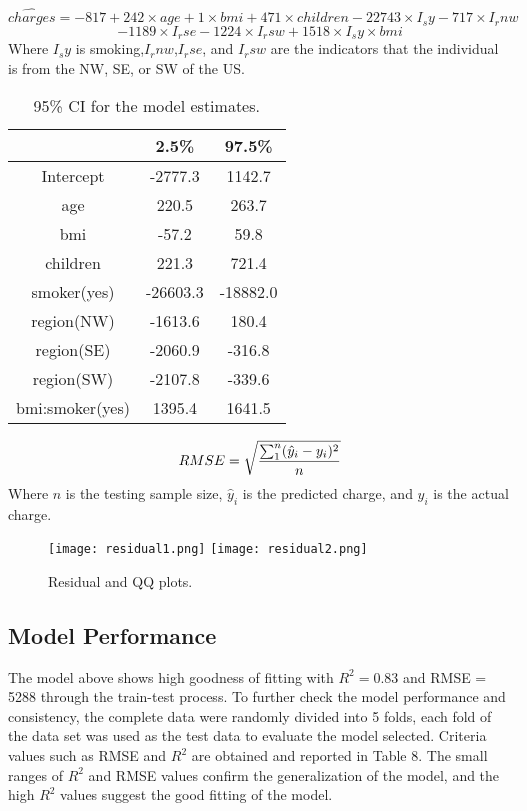 \documentclass[12pt]{article}
\begin{document}
\begin{equation}
\hat{charges} = -817 + 242\times age +1\times bmi +471\times children - 22743\times I_sy - 717\times I_rnw
\end{equation}
$$- 1189\times I_rse- 1224\times I_rsw+ 1518\times I_sy \times bmi$$
Where $I_sy$ is smoking,$I_rnw$,$I_rse$, and $I_rsw$ are the indicators that the individual is from the NW, SE, or SW of the US.

\begin{table}[ht]
\centering
\caption{ 95\% CI for the model estimates.\label{data3}}
\begin{tabular}{|c|c|c|}
\hline
&2.5\% &97.5\% \\\hline 
Intercept& -2777.3& 1142.7\\\hline 
age& 220.5& 263.7\\\hline 
bmi& -57.2& 59.8\\\hline 
children& 221.3& 721.4\\\hline 
smoker(yes)& -26603.3& -18882.0\\\hline 
region(NW)& -1613.6& 180.4\\\hline 
region(SE)& -2060.9& -316.8\\\hline 
region(SW)& -2107.8& -339.6\\\hline 
bmi:smoker(yes)& 1395.4& 1641.5\\\hline 	
\end{tabular}
\end{table}	

\begin{equation}
RMSE=\sqrt{\frac{\sum_{1}^{n}(\hat{y}_i-y_i)^2}{n}}\\
\end{equation}
Where $n$ is the testing sample size, $\hat{y}_i$ is the predicted charge, and $y_i$ is the actual charge.
	
\begin{figure}[!htbp]
\texttt{[image: residual1.png]}
\texttt{[image: residual2.png]}
\caption{Residual and QQ plots.}
\label{fig:method}
\end{figure}	

\subsection{Model Performance}
The model above shows high goodness of fitting with $R^2=0.83$ and RMSE = 5288 through the train-test process. To further check the model performance and consistency, the complete data were randomly divided into 5 folds, each fold of the data set was used as the test data to evaluate the model selected. Criteria values such as RMSE and $R^2$ are obtained and reported in Table 8. The small ranges of $R^2$ and RMSE values confirm the generalization of the model, and the high $R^2$ values suggest the good fitting of the model.
\end{document}
